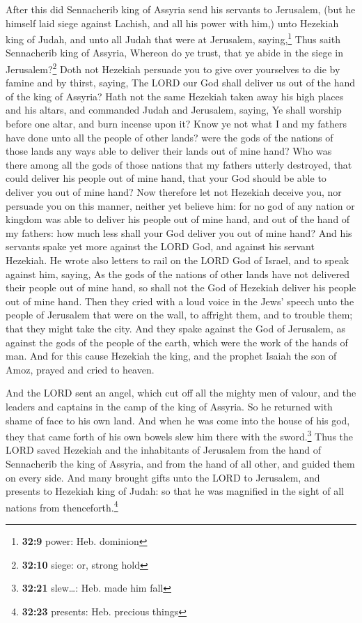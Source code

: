  After this did Sennacherib king of Assyria send his
servants to Jerusalem, (but he himself laid siege against Lachish, and
all his power with him,) unto Hezekiah king of Judah, and unto all Judah
that were at Jerusalem, saying,\footnote{\textbf{32:9} power: Heb.
  dominion}  Thus saith Sennacherib king of Assyria,
Whereon do ye trust, that ye abide in the siege in Jerusalem?\footnote{\textbf{32:10}
  siege: or, strong hold}  Doth not Hezekiah persuade you
to give over yourselves to die by famine and by thirst, saying, The LORD
our God shall deliver us out of the hand of the king of Assyria?
 Hath not the same Hezekiah taken away his high places
and his altars, and commanded Judah and Jerusalem, saying, Ye shall
worship before one altar, and burn incense upon it?  Know
ye not what I and my fathers have done unto all the people of other
lands? were the gods of the nations of those lands any ways able to
deliver their lands out of mine hand?  Who was there
among all the gods of those nations that my fathers utterly destroyed,
that could deliver his people out of mine hand, that your God should be
able to deliver you out of mine hand?  Now therefore let
not Hezekiah deceive you, nor persuade you on this manner, neither yet
believe him: for no god of any nation or kingdom was able to deliver his
people out of mine hand, and out of the hand of my fathers: how much
less shall your God deliver you out of mine hand?  And
his servants spake yet more against the LORD God, and against his
servant Hezekiah.  He wrote also letters to rail on the
LORD God of Israel, and to speak against him, saying, As the gods of the
nations of other lands have not delivered their people out of mine hand,
so shall not the God of Hezekiah deliver his people out of mine hand.
 Then they cried with a loud voice in the Jews' speech
unto the people of Jerusalem that were on the wall, to affright them,
and to trouble them; that they might take the city.  And
they spake against the God of Jerusalem, as against the gods of the
people of the earth, which were the work of the hands of man.
 And for this cause Hezekiah the king, and the prophet
Isaiah the son of Amoz, prayed and cried to heaven.

 And the LORD sent an angel, which cut off all the mighty
men of valour, and the leaders and captains in the camp of the king of
Assyria. So he returned with shame of face to his own land. And when he
was come into the house of his god, they that came forth of his own
bowels slew him there with the sword.\footnote{\textbf{32:21}
  slew\ldots: Heb. made him fall}  Thus the LORD saved
Hezekiah and the inhabitants of Jerusalem from the hand of Sennacherib
the king of Assyria, and from the hand of all other, and guided them on
every side.  And many brought gifts unto the LORD to
Jerusalem, and presents to Hezekiah king of Judah: so that he was
magnified in the sight of all nations from thenceforth.\footnote{\textbf{32:23}
  presents: Heb. precious things}

